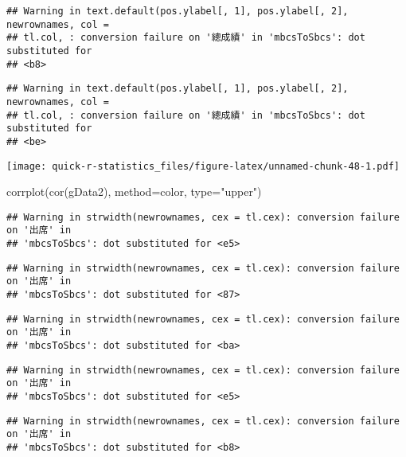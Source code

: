 \documentclass[
]{book}
\newenvironment{Shaded}{\begin{snugshade}}{\end{snugshade}}
\newcommand{\AttributeTok}[1]{\textcolor[rgb]{0.77,0.63,0.00}{#1}}
\newcommand{\FunctionTok}[1]{\textcolor[rgb]{0.00,0.00,0.00}{#1}}
\newcommand{\NormalTok}[1]{#1}
\newcommand{\StringTok}[1]{\textcolor[rgb]{0.31,0.60,0.02}{#1}}
\begin{document}
\begin{verbatim}
## Warning in text.default(pos.ylabel[, 1], pos.ylabel[, 2], newrownames, col =
## tl.col, : conversion failure on '總成績' in 'mbcsToSbcs': dot substituted for
## <b8>
\end{verbatim}

\begin{verbatim}
## Warning in text.default(pos.ylabel[, 1], pos.ylabel[, 2], newrownames, col =
## tl.col, : conversion failure on '總成績' in 'mbcsToSbcs': dot substituted for
## <be>
\end{verbatim}

\texttt{[image: quick-r-statistics\_files/figure-latex/unnamed-chunk-48-1.pdf]}

\begin{Shaded}
\begin{Highlighting}[]
\FunctionTok{corrplot}\NormalTok{(}\FunctionTok{cor}\NormalTok{(gData2), }\AttributeTok{method=}\StringTok{\textquotesingle{}color\textquotesingle{}}\NormalTok{, }\AttributeTok{type=}\StringTok{"upper"}\NormalTok{)}
\end{Highlighting}
\end{Shaded}

\begin{verbatim}
## Warning in strwidth(newrownames, cex = tl.cex): conversion failure on '出席' in
## 'mbcsToSbcs': dot substituted for <e5>
\end{verbatim}

\begin{verbatim}
## Warning in strwidth(newrownames, cex = tl.cex): conversion failure on '出席' in
## 'mbcsToSbcs': dot substituted for <87>
\end{verbatim}

\begin{verbatim}
## Warning in strwidth(newrownames, cex = tl.cex): conversion failure on '出席' in
## 'mbcsToSbcs': dot substituted for <ba>
\end{verbatim}

\begin{verbatim}
## Warning in strwidth(newrownames, cex = tl.cex): conversion failure on '出席' in
## 'mbcsToSbcs': dot substituted for <e5>
\end{verbatim}

\begin{verbatim}
## Warning in strwidth(newrownames, cex = tl.cex): conversion failure on '出席' in
## 'mbcsToSbcs': dot substituted for <b8>
\end{verbatim}
\end{document}
